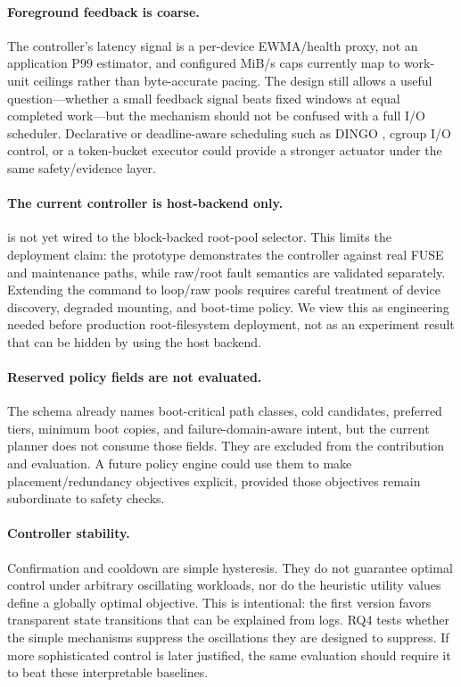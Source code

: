 \paragraph{Foreground feedback is coarse.}
The controller's latency signal is a per-device EWMA/health proxy, not an application P99 estimator, and configured MiB/s caps currently map to work-unit ceilings rather than byte-accurate pacing. The design still allows a useful question---whether a small feedback signal beats fixed windows at equal completed work---but the mechanism should not be confused with a full I/O scheduler. Declarative or deadline-aware scheduling such as DINGO \citep{athlur2026declarative}, cgroup I/O control, or a token-bucket executor could provide a stronger actuator under the same safety/evidence layer.

\paragraph{The current controller is host-backend only.}
\autopilot{} is not yet wired to the block-backed root-pool selector. This limits the deployment claim: the prototype demonstrates the controller against real \argosfs{} FUSE and maintenance paths, while raw/root fault semantics are validated separately. Extending the command to loop/raw pools requires careful treatment of device discovery, degraded mounting, and boot-time policy. We view this as engineering needed before production root-filesystem deployment, not as an experiment result that can be hidden by using the host backend.

\paragraph{Reserved policy fields are not evaluated.}
The schema already names boot-critical path classes, cold candidates, preferred tiers, minimum boot copies, and failure-domain-aware intent, but the current planner does not consume those fields. They are excluded from the contribution and evaluation. A future policy engine could use them to make placement/redundancy objectives explicit, provided those objectives remain subordinate to safety checks.

\paragraph{Controller stability.}
Confirmation and cooldown are simple hysteresis. They do not guarantee optimal control under arbitrary oscillating workloads, nor do the heuristic utility values define a globally optimal objective. This is intentional: the first version favors transparent state transitions that can be explained from logs. RQ4 tests whether the simple mechanisms suppress the oscillations they are designed to suppress. If more sophisticated control is later justified, the same evaluation should require it to beat these interpretable baselines.

